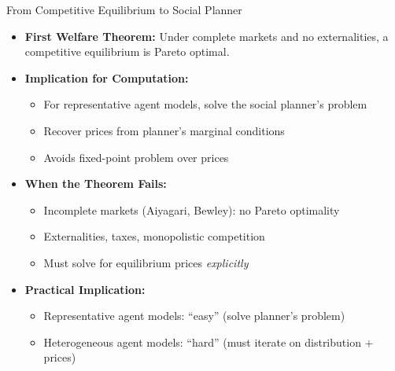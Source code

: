 \documentclass[10pt,english,aspectratio=169]{beamer}
\begin{document}
\begin{frame}{From Competitive Equilibrium to Social Planner}
\begin{itemize}
\item \textbf{First Welfare Theorem:} Under complete markets and no externalities, a competitive equilibrium is Pareto optimal.

\medskip
\item \textbf{Implication for Computation:}
\begin{itemize}
    \item For representative agent models, solve the social planner's problem
    \item Recover prices from planner's marginal conditions
    \item Avoids fixed-point problem over prices
\end{itemize}

\medskip
\item \textbf{When the Theorem Fails:}
\begin{itemize}
    \item Incomplete markets (Aiyagari, Bewley): no Pareto optimality
    \item Externalities, taxes, monopolistic competition
    \item Must solve for equilibrium prices \emph{explicitly}
\end{itemize}

\medskip
\item \textbf{Practical Implication:}
\begin{itemize}
    \item Representative agent models: ``easy'' (solve planner's problem)
    \item Heterogeneous agent models: ``hard'' (must iterate on distribution + prices)
\end{itemize}
\end{itemize}
\end{frame}

\end{document}
